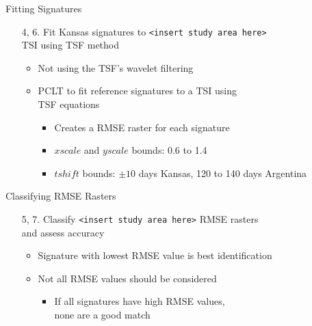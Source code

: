 \documentclass[  compress,xcolor={usenames,dvipsnames}]{beamer}
\begin{document}
\begin{frame}{Fitting Signatures}
\begin{enumerate}
  \item[4, 6.] Fit Kansas signatures to {\footnotesize\texttt{<insert study area here>}}\\TSI using TSF method
  \begin{itemize}
    \item<2-> Not using the TSF's wavelet filtering
    \item<3-> PCLT to fit reference signatures to a TSI using\\TSF equations
    \begin{itemize}
      \item<3-> Creates a RMSE raster for each signature
      \item<4-> $xscale$ and $yscale$ bounds: 0.6 to 1.4
      \item<5-> $tshift$ bounds: $\pm10$ days Kansas, 120 to 140 days Argentina
    \end{itemize}
  \end{itemize}
\end{enumerate}
\end{frame}

\begin{frame}{Classifying RMSE Rasters}
\begin{enumerate}
  \item[5, 7.] Classify {\footnotesize\texttt{<insert study area here>}} RMSE rasters\\and assess accuracy
  \begin{itemize}
    \item<2-> Signature with lowest RMSE value is best identification
    \item<3-> Not all RMSE values should be considered
    \begin{itemize}
      \item<4-> If all signatures have high RMSE values,\\none are a good match
    \end{itemize}
  \end{itemize}
\end{enumerate}
\end{frame}
\end{document}
